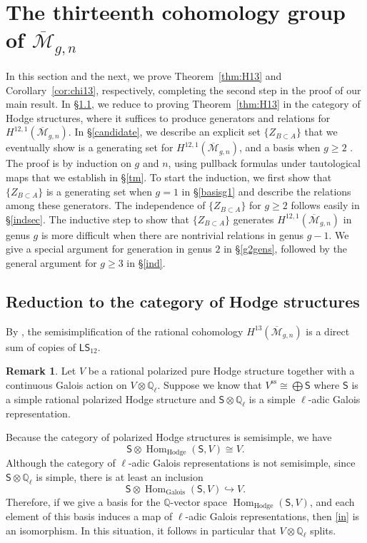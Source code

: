 \documentclass[12pt]{amsart}
\theoremstyle{definition}
\newtheorem{rem}[thm]{Remark}
\numberwithin{equation}{section}
\newcommand{\semis}{\mathrm{ss}}
\newcommand{\s}{\mathsf{S}}
\newcommand{\M}{\mathcal{M}}
\DeclareMathOperator{\Hom}{Hom}
\newcommand{\Q}{\mathbb{Q}}
\newcommand{\Mb}{\overline{\M}}
\theoremstyle{definition} %
\theoremstyle{remark}
\begin{document}
\section{The thirteenth cohomology group of \texorpdfstring{$\Mb_{g,n}$}{Mbgn}} \label{h13sec}
In this section and the next, we prove Theorem~\ref{thm:H13} and Corollary~\ref{cor:chi13}, respectively, completing the second step in the proof of our main result. In \S\ref{reduction}, we reduce to proving Theorem~\ref{thm:H13} in the category of Hodge structures, where it suffices to produce generators and relations for $H^{12,1}(\Mb_{g,n})$. In \S\ref{candidate}, we describe an explicit set $\{ Z_{B\subset A} \}$ that we eventually show is a generating set for $H^{12,1}(\Mb_{g,n})$, and a basis when $g \geq 2$ . The proof is by induction on $g$ and $n$, using pullback formulas under tautological maps that we establish in \S\ref{tm}. To start the induction, we first show that $\{ Z_{B \subset A} \}$ is a generating set when $g = 1$  in \S\ref{basisg1} and describe the relations among these generators. The independence of $\{ Z_{B \subset A} \}$ for $g \geq 2$ follows easily in \S\ref{indsec}. The inductive step to show that $\{Z_{B \subset A}\}$ generates $H^{12,1}(\Mb_{g,n})$ in genus $g$ is more difficult when there are nontrivial relations in genus $g - 1$. We give a special argument for generation in genus $2$ in \S\ref{g2gens}, followed by the general argument for $g \geq 3$ in \S\ref{ind}.



\subsection{Reduction to the category of Hodge structures} 
\label{reduction} 
By \cite[Theorem 1.1]{CLP-STE}, the semisimplification of the rational cohomology $H^{13}(\Mb_{g,n})$ is a direct sum of copies of $\mathsf{L}\mathsf{S}_{12}$.

\begin{rem}\label{rem:homs}
Let $V$ be a rational polarized pure Hodge structure together with a continuous Galois action on $V \otimes \Q_\ell$.  Suppose we know that $V^\semis \cong \bigoplus \s$ where $\s$ is a simple rational polarized Hodge structure and $\s \otimes \Q_\ell$ is a simple $\ell$-adic Galois representation.

Because the category of polarized Hodge structures is semisimple, we have
\[\mathsf{S} \otimes \Hom_{\mathrm{Hodge}}(\mathsf{S}, V) \cong V.
\]
Although the category of $\ell$-adic Galois representations is not  semisimple, since $\s \otimes \Q_\ell$ is simple, there is at least an inclusion
\begin{equation} \label{in} \mathsf{S} \otimes \Hom_{\mathrm{Galois}}(\mathsf{S}, V) \hookrightarrow V.
\end{equation}
Therefore, if we give a basis for the $\Q$-vector space $\Hom_{\mathrm{Hodge}}(\mathsf{S}, V)$, and each element of this basis induces a map of $\ell$-adic Galois representations, then \eqref{in} is an isomorphism. In this situation, it follows in particular that $V \otimes \Q_\ell$ splits. 
\end{rem}
\end{document}
